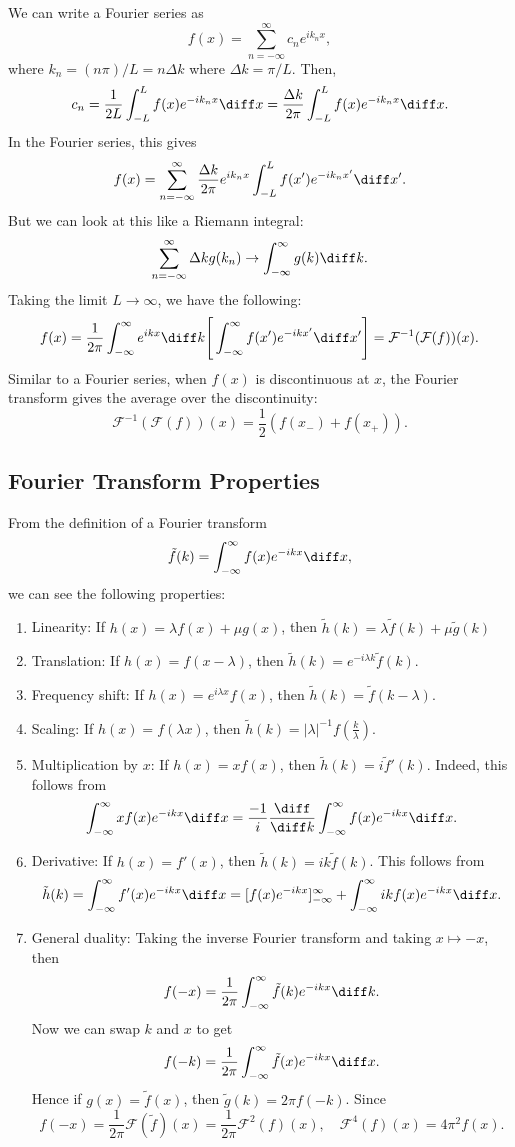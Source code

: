 \documentclass[12pt]{article}
\begin{document}
We can write a Fourier series as
\[
	f(x) = \sum_{n = -\infty}^{\infty} c_n e^{i k_n x}
,\]
where $k_n = (n\pi)/L = n \Delta k$ where $\Delta k = \pi/L$. Then,
\[
	c_n = \frac{1}{2L} \int_{-L}^{L} f(x) e^{-ik_n x}\diff x = \frac{\Delta k}{2 \pi} \int_{-L}^{L} f(x) e^{-ik_nx}\diff x
.\]
In the Fourier series, this gives
\[
	f(x) = \sum_{n = -\infty}^{\infty} \frac{\Delta k}{2 \pi} e^{i k_n x} \int_{-L}^{L}f(x') e^{-ik_n x'}\diff x'
.\]
But we can look at this like a Riemann integral:
\[
	\sum_{n = -\infty}^{\infty} \Delta k g(k_n) \to \int_{-\infty}^{\infty} g(k) \diff k
.\]
Taking the limit $L \to \infty$, we have the following:
\[
f(x) = \frac{1}{2 \pi} \int_{-\infty}^{\infty} e^{ikx} \diff k \Biggr[ \int_{-\infty}^{\infty} f(x') e^{-ikx'} \diff x' \Biggr] = \mathcal{F}^{-1}(\mathcal{F}(f))(x)
.\]
Similar to a Fourier series, when $f(x)$ is discontinuous at $x$, the Fourier transform gives the average over the discontinuity:
\[
	\mathcal{F}^{-1}(\mathcal{F}(f))(x) = \frac{1}{2}(f(x_{-}) + f(x_{+}))
.\]

\subsection{Fourier Transform Properties}%
\label{sub:fourier_transform_properties}

From the definition of a Fourier transform
\[
	\tilde f(k) = \int_{-\infty}^{\infty} f(x) e^{-ikx}\diff x
,\]
we can see the following properties:
\begin{enumerate}[1.]
	\item Linearity: If $h(x) = \lambda f(x) + \mu g(x)$, then $\tilde h(k) = \lambda \tilde f(k) + \mu \tilde g(k)$
	\item Translation: If $h(x) = f(x - \lambda)$, then $\tilde h (k) = e^{-i\lambda k}\tilde f(k)$.
	\item Frequency shift: If $h(x) = e^{i \lambda x}f(x)$, then $\tilde h(k) = \tilde f(k - \lambda)$.
	\item Scaling: If $h(x) = f(\lambda x)$, then $\tilde h(k) = |\lambda|^{-1} f(\frac{k}{\lambda})$.
	\item Multiplication by $x$: If $h(x) = x f(x)$, then $\tilde h(k) = i \tilde f'(k)$. Indeed, this follows from
		\[
			\int_{-\infty}^{\infty} xf(x) e^{-ikx}\diff x = \frac{-1}{i} \frac{\diff}{\diff k} \int_{-\infty}^{\infty} f(x) e^{-ikx} \diff x
		.\]
	\item Derivative: If $h(x) = f'(x)$, then $\tilde h(k) = i k \tilde f(k)$. This follows from
		\[
			\tilde h(k) = \int_{-\infty}^{\infty} f'(x) e^{-ikx}\diff x = [f(x) e^{-ikx}]_{-\infty}^{\infty} + \int_{-\infty}^{\infty} ik f(x) e^{-ikx} \diff x
		.\]
	\item General duality: Taking the inverse Fourier transform and taking $x \mapsto -x$, then
		\[
			f(-x) = \frac{1}{2\pi} \int_{-\infty}^{\infty} \tilde f(k) e^{-ikx} \diff k
		.\]
		Now we can swap $k$ and $x$ to get
		\[
			f(-k)= \frac{1}{2\pi} \int_{-\infty}^{\infty} \tilde f(x) e^{-ikx} \diff x
		.\]
		Hence if $g(x) = \tilde f(x)$, then $\tilde g(k) = 2 \pi f(-k)$. Since
		\[
			f(-x) = \frac{1}{2\pi}\mathcal{F}(\tilde f)(x) = \frac{1}{2\pi} \mathcal{F}^2(f)(x), \quad \mathcal{F}^{4}(f)(x) = 4 \pi^2 f(x)
		.\]
\end{enumerate}
\end{document}
